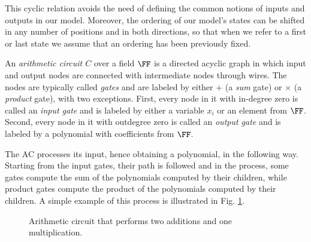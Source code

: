 \begin{enumerate}
\begin{remark}
    This cyclic relation avoids the need of defining the common notions of inputs and outputs in our model. Moreover, the ordering of our model's states can be shifted in any number of positions and in both directions, so that when we refer to a first or last state we assume that an ordering has been previously fixed.
\end{remark}
\end{enumerate}


\begin{definition}
An \textit{arithmetic circuit $C$} over a field $\FF$ is a directed acyclic graph in which input and output nodes are connected with intermediate nodes through wires. The nodes are typically called \textit{gates} and are labeled by either $+$ (a \textit{sum} gate) or $\times$ (a \textit{product} gate), with two exceptions. First, every node in it with in-degree zero is called an \textit{input gate} and is labeled by either a variable $x_i$ or an element from $\FF$. Second, every node in it with outdegree zero is called an \textit{output gate} and is labeled by a polynomial with coefficients from $\FF$.

The AC processes its input, hence obtaining a polynomial, in the following way. Starting from the input gates, their path is followed and in the process, some gates compute the sum of the polynomials computed by their children, while product gates compute the product of the polynomials computed by their children. A simple example of this process is illustrated in Fig. \ref{fig:arithmeticCircuit}.
\end{definition}

\begin{figure}[H]
\centering
{}
\caption{Arithmetic circuit that performs two additions and one multiplication.}
\label{fig:arithmeticCircuit}
\end{figure}


